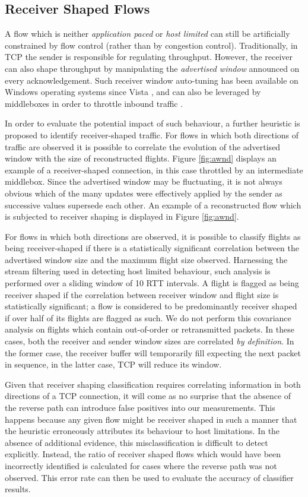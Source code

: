 \subsection{Receiver Shaped Flows}
\label{section:rate:recv}

A flow which is neither \emph{application paced} or \emph{host limited} can still be artificially constrained by flow control (rather than by congestion control).
Traditionally, in \ac{TCP} the sender is responsible for regulating throughput. 
However, the receiver can also shape throughput by manipulating the \emph{advertised window} announced on every acknowledgement.
Such receiver window auto-tuning has been available on Windows operating systems since Vista \cite{vistaReceiveWindow}, and can also be leveraged by middleboxes in order to throttle inbound traffic \cite{appEx}.

In order to evaluate the potential impact of such behaviour, a further heuristic is proposed to identify receiver-shaped traffic.
For flows in which both directions of traffic are observed it is possible to correlate the evolution of the advertised window with the size of reconstructed flights.
Figure \ref{fig:awnd} displays an example of a receiver-shaped connection, in this case throttled by an intermediate middlebox.
Since the advertised window may be fluctuating, it is not always obvious which of the many updates were effectively applied by the sender as successive values supersede each other.
An example of a reconstructed flow which is subjected to receiver shaping is displayed in Figure \ref{fig:awnd}.

For flows in which both directions are observed, it is possible to classify flights as being receiver-shaped if there is a statistically significant correlation between the advertised window size and the maximum flight size observed.
Harnessing the stream filtering used in detecting host limited behaviour, such analysis is performed over a sliding window of 10 \ac{RTT} intervals.
A flight is flagged as being receiver shaped if the correlation between receiver window and flight size is statistically significant; a flow is considered to be predominantly receiver shaped if over half of its flights are flagged as such.
We do not perform this covariance analysis on flights which contain out-of-order or retransmitted packets. 
In these cases, both the receiver and sender window sizes are correlated \emph{by definition}. 
In the former case, the receiver buffer will temporarily fill expecting the next packet in sequence, in the latter case, \ac{TCP} will reduce its window.

Given that receiver shaping classification requires correlating information in both directions of a \ac{TCP} connection, it will come as no surprise that the absence of the reverse path can introduce false positives into our measurements. 
This happens because any given flow might be receiver shaped in such a manner that the heuristic erroneously attributes its behaviour to host limitations. 
In the absence of additional evidence, this misclassification is difficult to detect explicitly. 
Instead, the ratio of receiver shaped flows which would have been incorrectly identified is calculated for cases where the reverse path was not observed. 
This error rate can then be used to evaluate the accuracy of classifier results.
